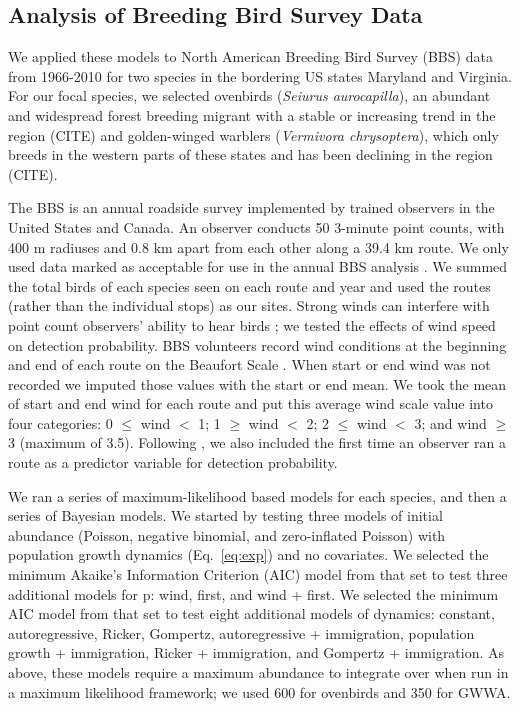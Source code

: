 \documentclass[12pt]{article}
\begin{document}
\subsection{Analysis of Breeding Bird Survey Data}

We applied these models to North American Breeding Bird Survey (BBS)
data from 1966-2010 for two species in the bordering US states
Maryland and Virginia.  For our focal species, we selected ovenbirds
(\textit{Seiurus aurocapilla}), an abundant and widespread forest breeding
migrant with a stable or increasing trend in the region (CITE) and
golden-winged warblers (\textit{Vermivora chrysoptera}), which only breeds in
the western parts of these states and has been declining in the region
(CITE).  %

The BBS is an annual roadside survey implemented by trained observers
in the United States and Canada. An observer conducts 50 3-minute point counts,
with 400 m radiuses and 0.8 km apart from each other along a 39.4 km route.
We only used data marked as acceptable for use in the annual BBS analysis
\citep{sauer_etal:1994auk}.  We summed the total birds of each
species seen on each route and year and used the routes (rather than
the individual stops) as our sites.
Strong winds can interfere with point count observers' ability to hear
birds \citep{simons_etal:2007}; we tested the effects of wind speed
on detection probability.  BBS volunteers record wind conditions at
the beginning and end of each route on the Beaufort Scale
\citep[start and end wind 0-9]{robbins_etal:1986}.
When
start or end wind was not recorded we imputed those values with the
start or end mean.  We took the mean of start and end wind for each
route and put this average wind scale value into four categories: 0 $\leq$
wind $<$ 1; 1 $\geq$ wind $<$ 2; 2 $\leq$ wind $<$ 3; and wind $\geq$ 3 (maximum of 3.5).
Following \citet{link_sauer:2002},
we also included the first time an
observer ran a route as a predictor variable for detection
probability.

We ran a series of maximum-likelihood based models for each species,
and then a series of Bayesian models.  We started by testing three
models of initial abundance (Poisson, negative binomial, and
zero-inflated Poisson) with population growth dynamics (Eq.~\ref{eq:exp})
and no covariates.  We selected the minimum Akaike's Information
Criterion (AIC) model from that set to test three additional models
for p: wind, first, and wind + first.   We selected the minimum AIC
model from that set to test eight additional models of dynamics:
constant, autoregressive, Ricker, Gompertz, autoregressive +
immigration, population growth + immigration, Ricker + immigration,
and Gompertz + immigration.  %
As above, these models require a maximum abundance to integrate over
when run in a maximum likelihood
framework; we used 600 for ovenbirds and 350
for GWWA.
\end{document}
